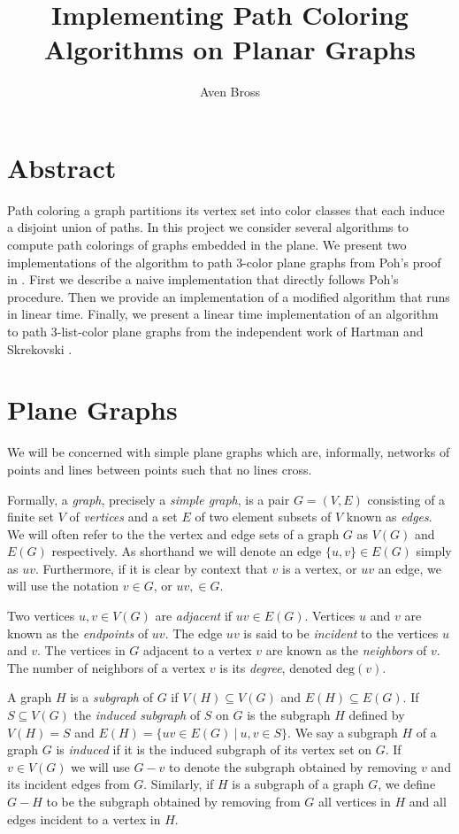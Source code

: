 \documentclass[letterpaper, 12pt]{amsart}
\title{Implementing Path Coloring Algorithms on Planar Graphs}
\author{Aven Bross}
\theoremstyle{definition}
\theoremstyle{definition}
\theoremstyle{thm}
\theoremstyle{definition}
\begin{document}
\maketitle

\section*{Abstract}

Path coloring a graph partitions its vertex set into color classes that
each induce a disjoint union of paths. In this project we consider several
algorithms to compute path colorings of graphs embedded in the plane. We present
two implementations of the algorithm to path 3-color plane graphs from Poh's
proof in \cite{poh}. First we describe a naive implementation that directly follows
Poh's procedure. Then we provide an implementation of a modified algorithm
that runs in linear
time. Finally, we present a linear time implementation of an algorithm to path
3-list-color plane graphs from the independent work of Hartman \cite{hartman}
and Skrekovski \cite{skrekovski}.

\section{Plane Graphs}

We will be concerned with simple plane graphs which are, informally, networks
of points and lines between points such that no lines cross.

Formally, a \textit{graph}, precisely a \textit{simple graph}, is a pair
$G=(V,E)$ consisting of a finite set $V$ of \textit{vertices} and a set $E$ of
two element subsets of $V$ known as \textit{edges}. We will often refer to the
the vertex and edge sets of a graph $G$ as $V(G)$ and $E(G)$ respectively. As
shorthand we will denote an edge $\{u,v\}\in E(G)$ simply as $uv$. Furthermore,
if it is clear by context that $v$ is a vertex, or $uv$ an edge, we will use the
notation $v\in G$, or $uv,\in G$.

Two vertices $u,v\in V(G)$ are \textit{adjacent} if $uv\in E(G)$. Vertices $u$
and $v$ are known as the \textit{endpoints} of $uv$. The edge $uv$ is said to be
\textit{incident} to the vertices $u$ and $v$. The vertices in $G$ adjacent to a vertex
$v$ are known as the \textit{neighbors} of $v$. The number of neighbors of a
vertex $v$ is its \textit{degree}, denoted $\text{deg}(v)$.

A graph $H$ is a \textit{subgraph} of $G$ if $V(H)\subseteq V(G)$ and
$E(H)\subseteq E(G)$. If $S\subseteq V(G)$ the \textit{induced subgraph} of
$S$ on $G$ is the subgraph $H$ defined by $V(H)=S$ and
$E(H)=\{uv\in E(G) \ | \ u,v\in S\}$. We say a subgraph $H$ of a graph $G$ is
\textit{induced} if it is the induced subgraph of its vertex set on $G$. If
$v\in V(G)$ we will use $G-v$ to denote the subgraph obtained by removing $v$
and its incident edges from $G$. Similarly, if $H$ is a subgraph of a graph $G$,
we define $G-H$ to be the subgraph obtained by removing from $G$ all vertices in
$H$ and all edges incident to a vertex in $H$.
\end{document}
